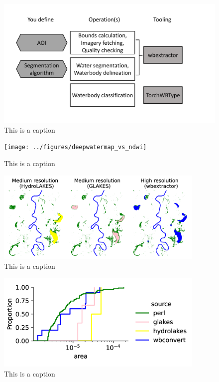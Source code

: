\documentclass{article}
\begin{document}
\begin{figure}
	\centering
	\includegraphics[width=12cm]{../figures/diagram_pipeline}
	\caption{This is a caption}
	\label{fig:diagram_pipeline}
\end{figure}


\begin{figure}
	\centering
	\texttt{[image: ../figures/deepwatermap\_vs\_ndwi]}
	\caption{This is a caption}
	\label{fig:deepwatermap_vs_ndwi}
\end{figure}

\begin{figure}
	\centering
	\includegraphics[width=10cm]{../figures/floodplain}
	\caption{This is a caption}
	\label{fig:floodplain}
\end{figure}

\begin{figure}
	\centering
	\includegraphics[width=10cm]{../figures/accuracy}
	\caption{This is a caption}
	\label{fig:accuracy}
\end{figure}
\end{document}
